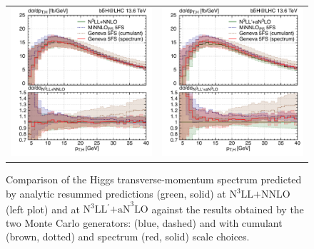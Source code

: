 \documentclass[11pt,a4paper]{article}
\begin{document}
\begin{figure}[t!]
\begin{center}
\begin{tabular}{cc}
\includegraphics[width=.45\textwidth, page=1]{plots/5fs/genevaminnlo/n3llnnloresvsMCs-withspectrum.pdf}&
\includegraphics[width=.45\textwidth, page=1]{plots/5fs/genevaminnlo/n3llan3loresvsMCs-withspectrum.pdf}
\end{tabular}
\vspace*{1ex}
\caption{Comparison of the Higgs transverse-momentum spectrum predicted by analytic resummed predictions (green, solid) at $\text{N}^3\text{LL+NNLO}$ (left plot) and at $\text{N}^3\text{LL$^{\prime}$+aN}^3\text{LO}$ against the results obtained by the two Monte Carlo generators: \minnlo{} (blue, dashed) and \GENEVA{} with cumulant (brown, dotted) and spectrum (red, solid) scale choices. \label{fig:resVSMCs}}
\end{center}
\end{figure}
\end{document}
